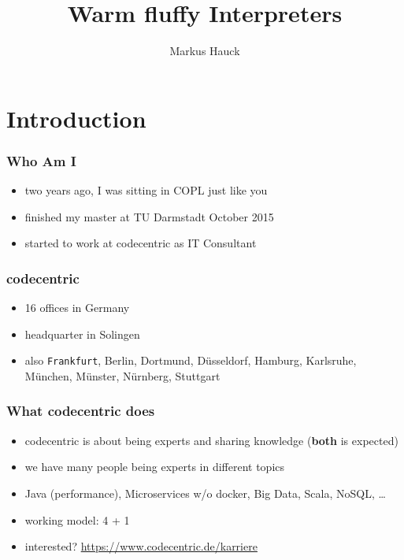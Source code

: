 \documentclass{beamer}
\author{Markus Hauck}
\institute{codecentric AG}
\title{Warm fluffy Interpreters}
\begin{document}
{
  \begin{frame}
    \titlepage{}
  \end{frame}
}

\begin{frame}
  \tableofcontents
\end{frame}

\section{Introduction}

\begin{frame}
  \frametitle{Who Am I}
  \begin{itemize}
  \item two years ago, I was sitting in COPL just like you
  \item finished my master at TU Darmstadt October 2015
  \item started to work at codecentric as IT Consultant
  \end{itemize}
\end{frame}

\begin{frame}
  \frametitle{codecentric}
  \begin{itemize}
  \item 16 offices in Germany
  \item headquarter in Solingen
  \item also \texttt{Frankfurt}, Berlin, Dortmund, Düsseldorf,
    Hamburg, Karlsruhe, München, Münster, Nürnberg, Stuttgart
  \end{itemize}
\end{frame}

\begin{frame}
  \frametitle{What codecentric does}
  \begin{itemize}
  \item codecentric is about being experts and sharing knowledge (\textbf{both}
    is expected)
  \item we have many people being experts in different topics
  \item Java (performance), Microservices w/o docker, Big Data, Scala, NoSQL,
    \ldots
  \item working model: 4 + 1
  \item interested? \url{https://www.codecentric.de/karriere}
  \end{itemize}
\end{frame}
\end{document}
